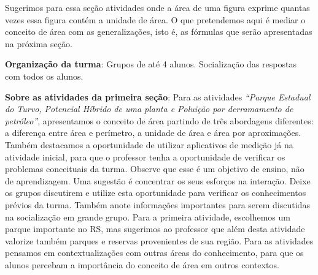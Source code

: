 \begin{paginatexto}
Sugerimos para essa seção atividades onde a área de uma figura exprime quantas vezes essa figura contém a unidade de área. O que pretendemos aqui é mediar o conceito de área com as generalizações, isto é, as fórmulas que serão apresentadas na próxima seção. 

\textbf{Organização da turma}: Grupos de até 4 alunos. Socialização das respostas com todos os alunos.

\textbf{Sobre as atividades da primeira seção}: Para as atividades \textit{“Parque Estadual do Turvo, Potencial Híbrido de uma planta e Poluição por derramamento de petróleo”}, apresentamos o conceito de área partindo de três abordagens diferentes: a diferença entre área e perímetro, a unidade de área e área por aproximações. Também destacamos a oportunidade de utilizar aplicativos de medição já na atividade inicial, para que o professor tenha a oportunidade de verificar os problemas conceituais da turma. Observe que esse é um objetivo de ensino, não de aprendizagem. Uma sugestão é concentrar os seus esforços na interação. Deixe os grupos discutirem e utilize esta oportunidade para verificar os conhecimentos prévios da turma. Também anote informações importantes para serem discutidas na socialização em grande grupo. Para a primeira atividade, escolhemos um parque importante no RS, mas sugerimos ao professor que além desta atividade valorize também parques e reservas provenientes de sua região. Para as atividades pensamos em contextualizações com outras áreas do conhecimento, para que os alunos percebam a importância do conceito de área em outros contextos. 
\end{paginatexto}



